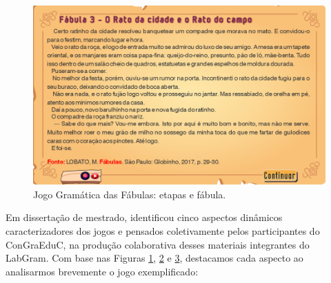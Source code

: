 \begin{figure}[h] 
\centering
\begin{minipage}{.7\textwidth}
\includegraphics[width=\textwidth]{figure03.png}
\caption{Jogo Gramática das Fábulas: etapas e fábula.}
\label{fig:fig03}
\end{minipage}
\end{figure}

Em dissertação de mestrado, \textcite{ribeiro_producao_2021} identificou cinco aspectos
dinâmicos caracterizadores dos jogos e pensados coletivamente pelos
participantes do ConGraEduC, na produção colaborativa desses materiais
integrantes do LabGram. Com base nas Figuras \hyperref[fig:fig01]{1}, \hyperref[fig:fig02]{2} e \hyperref[fig:fig03]{3}, destacamos cada
aspecto ao analisarmos brevemente o jogo exemplificado:

